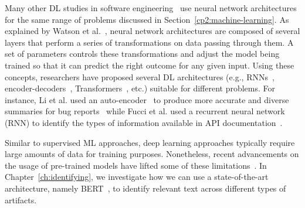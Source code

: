 Many other \acs{DL} studies in software engineering~\cite{ferreira2021,li2018deep}
use neural network architectures 
for the same range of problems discussed in Section~\ref{cp2:machine-learning}.
As explained by Watson et al.~\cite{watson2022},
neural network architectures are composed of several layers 
that perform a series of transformations on data passing through them. 
A set of parameters controls these transformations and 
adjust the model being trained so that it can predict 
the right outcome for any given input.
Using these concepts, researchers have proposed 
several  \acs{DL} architectures (e.g., \acs{RNN}s~\cite{rumelhart1986rnn, sutskever2014seq2seq}, encoder-decoders~\cite{bahdanau2014neural}, Transformers~\cite{Vaswani2017attention}, etc.) 
suitable for different problems. 
For instance,
Li et al. used an auto-encoder~\cite{liou2014autoencoder}
to produce more accurate and diverse summaries 
for bug reports~\cite{li2018deep} while 
Fucci et al. used a 
recurrent neural network (\acs{RNN}) 
to identify the types of information available in 
API documentation~\cite{fucci2019}.



Similar to supervised \acs{ML} approaches, deep learning approaches 
typically require large amounts of data for training purposes.
Nonetheless, recent advancements on the usage of
pre-trained models 
have lifted some of these limitations~\cite{erhan2010pre-train}.
In Chapter~\ref{ch:identifying},
we investigate how we can use a state-of-the-art architecture, namely BERT~\cite{Devlin2018Bert},
to identify relevant text across different types of artifacts.
















